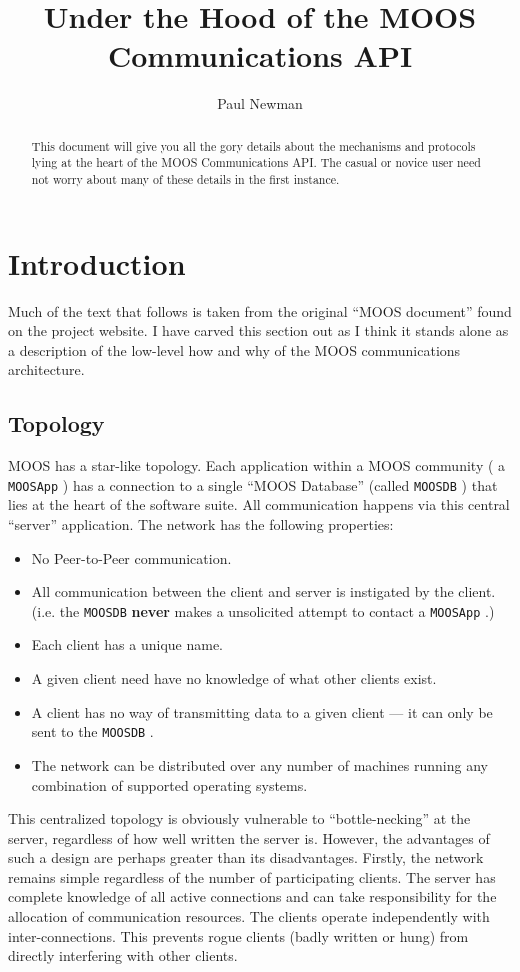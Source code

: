 \documentclass[a4paper,10pt]{article}
\title{Under the Hood of the MOOS Communications API}
\author{Paul Newman}
\newcommand{\Code}[1]{\texttt{#1} }
\newcommand{\code}[1]{\Code{#1} }
\newcommand{\DB}   {\code{{MOOSDB}}}
\newcommand{\MA}   {\code{{MOOSApp}}}
\begin{document}
\maketitle

\begin{center}
\end{center}
\begin{abstract}
This document will  give you all the gory details about the mechanisms and protocols
lying at the heart of the MOOS Communications API. The casual or novice user need not worry about many of these details
in the first instance.
\end{abstract}


\section{Introduction}

Much of the text that follows is taken from the original ``MOOS document''
found on the project website. I have carved this section out as I think it stands alone
as a description of the low-level how and why of the MOOS communications architecture.


\subsection{Topology}\label{Sec:Topology}
MOOS has a star-like topology. Each application within a MOOS
community ( a \MA) has a connection to a single ``MOOS Database''
(called \DB) that lies at the heart of the software suite. All
communication happens via this central ``server'' application. The
network has the following properties:
\begin{itemize}
\item No Peer-to-Peer communication.
\item All communication  between the client and server is instigated by the
client. (i.e. the \DB {\textbf{never}} makes a unsolicited attempt
to contact a \MA.)
\item Each client has a unique name.
\item A given client need have no knowledge of what other clients exist.
\item A client has no way of transmitting data to a given client ---
it can only be sent to  the \DB.
\item The network can be distributed over any number of machines
running any combination of supported operating systems.
\end{itemize}
This centralized topology is obviously vulnerable to
``bottle-necking'' at the server, regardless of how well written
the server is. However, the advantages of such a design are perhaps
greater than its disadvantages. Firstly, the network remains simple
regardless of the number of participating clients. The server has
complete knowledge of all active connections and can take
responsibility for the allocation of communication resources. The
clients operate independently  with inter-connections. This
prevents rogue clients (badly written or hung) from directly
interfering with other clients.
\end{document}
